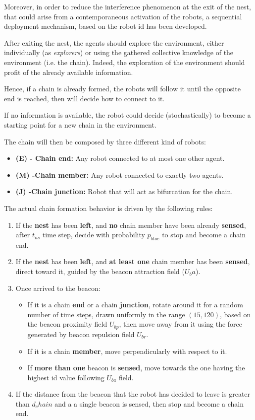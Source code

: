 Moreover, in order to reduce the interference phenomenon at the exit of the nest, that could arise from a contemporaneous activation of the robots, a sequential deployment mechanism, based on the robot id has been developed.

After exiting the nest, the agents should explore the environment, either individually (as \emph{explorers}) or using the gathered collective knowledge of the environment (i.e. the chain).
Indeed, the exploration of the environment should profit of the already available information.

Hence, if a chain is already formed, the robots will follow it until the opposite end is reached, then will decide how to connect to it.

If no information is available, the robot could decide (stochastically) to become a starting point for a new chain in the environment. 

The chain will then be composed by three different kind of robots:
\begin{itemize}
  \item \textbf{(E) - Chain end:} Any robot connected to at most one other agent.
  \item \textbf{(M) -Chain member:} Any robot connected to exactly two agents.
  \item \textbf{(J) -Chain junction:} Robot that will act as bifurcation for the chain.
\end{itemize}

The actual chain formation behavior is driven by the following rules:
\begin{enumerate}
  \item If the \textbf{nest} has been \textbf{left}, and \textbf{no} chain member have been already \textbf{sensed}, after $t_{ns}$ time step, decide with probability $p_{btoe}$ to stop and become a chain end.
  \item If the \textbf{nest} has been \textbf{left}, and \textbf{at least one} chain member has been \textbf{sensed}, direct toward it, guided by the beacon attraction field ($U_ba$).
  \item Once arrived to the beacon:
    \begin{itemize}
      \item If it is a chain \textbf{end} or a chain \textbf{junction}, rotate around it for a random number of time steps, drawn uniformly in the range $(15,120)$, based on the beacon proximity field $U_{bp}$, then move away from it using the force generated by beacon repulsion field $U_{br}$.
      \item If it is a chain \textbf{member}, move perpendicularly with respect to it.
      \item If \textbf{more than one} beacon is \textbf{sensed}, move towards the one having the highest id value following $U_{ba}$ field.
    \end{itemize}
    \item If the distance from the beacon that the robot has decided to leave is greater than $d_chain$ and a a single beacon is sensed, then stop and become a chain end.
\end{enumerate}

